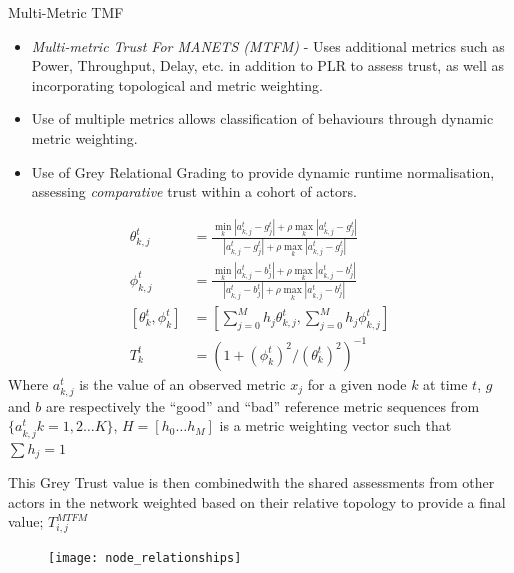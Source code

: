\documentclass{beamer}
\begin{document}
\begin{frame}[allowframebreaks]{Multi-Metric TMF}
  \begin{itemize} 
    \item \emph{Multi-metric Trust For MANETS (MTFM)} \cite{Guo11} - Uses additional metrics such as Power, Throughput, Delay, etc. in addition to PLR to assess trust, as well as incorporating topological and metric weighting.
    \item Use of multiple metrics allows classification of behaviours through dynamic metric weighting.
    \item Use of Grey Relational Grading to provide dynamic runtime normalisation, assessing \emph{comparative} trust within a cohort of actors.
  \end{itemize}
  \framebreak
\begin{align}
  \label{eq:grcg}
  \theta_{k,j}^t &= \frac{\min_k|a_{k,j}^t - g_j^t| + \rho \max_k|a_{k,j}^t-g_j^t|}{|a_{k,j}^t-g_j^t| + \rho \max_k|a_{k,j}^t-g_j^t|} \\
  \label{eq:grcb}
  \phi_{k,j}^t &= \frac{\min_k|a_{k,j}^t - b_j^t| + \rho \max_k|a_{k,j}^t-b_j^t|}{|a_{k,j}^t-b_j^t| + \rho \max_k|a_{k,j}^t-b_j^t|}  \\
  \label{eq:grc}
  [\theta_k^t, \phi_k^t]& = \left[\sum_{j=0}^M h_j \theta_{k,j}^t,\sum_{j=0}^M h_j \phi_{k,j}^t \right]\\
  \label{eq:grcT}
  T_k^t &= ({1+{(\phi_k^t)^2}/{(\theta_k^t)^2}})^{-1}
\end{align}
Where  $a_{k,j}^t$ is the value of an observed metric $x_j$ for a given node $k$ at time $t$,  $g$ and $b$ are respectively the ``good'' and ``bad'' reference metric sequences from $\{a_{k,j}^t k=1,2\dots K\}$, $H=[h_0\dots h_M]$ is a metric weighting vector such that $\sum h_j = 1$

  \framebreak

  This Grey Trust value is then combined\footnotemark with the shared assessments from other actors in the network weighted based on their relative topology to provide a final value; $T_{i,j}^{MTFM}$
    \begin{figure}[h]
      \centering
      \texttt{[image: node\_relationships]}
      \label{fig:node_relationships}
    \end{figure}

\end{frame}
\end{document}

